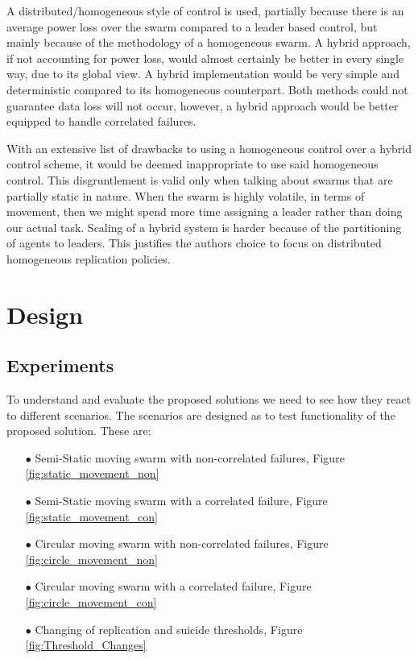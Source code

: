 \documentclass{UoYCSproject}
\begin{document}
A distributed/homogeneous style of control is used, partially because there is an average power loss over the swarm compared to a leader based control, but mainly because of the methodology of a homogeneous swarm. A hybrid approach, if not accounting for power loss, would almost certainly be better in every single way, due to its global view. A hybrid implementation would be very simple and deterministic compared to its homogeneous counterpart. Both methods could not guarantee data loss will not occur, however, a hybrid approach would be better equipped to handle correlated failures.

With an extensive list of drawbacks to using a homogeneous control over a hybrid control scheme, it would be deemed inappropriate to use said homogeneous control. This disgruntlement is valid only when talking about swarms that are partially static in nature. When the swarm is highly volatile, in terms of movement, then we might spend more time assigning a leader rather than doing our actual task. Scaling of a hybrid system is harder because of the partitioning of agents to leaders. This justifies the authors choice to focus on distributed homogeneous replication policies.


\chapter{Design}
\label{cha:Design}

\section{Experiments}
\label{sec:expriments}

To understand and evaluate the proposed solutions we need to see how they react to different scenarios.
The scenarios are designed as to test functionality of the proposed solution.
These are:

\begin{itemize}
\itemsep-1em
\item[$\bullet$] Semi-Static moving swarm with non-correlated failures, Figure \ref{fig:static_movement_non}
\item[$\bullet$] Semi-Static moving swarm with a correlated failure, Figure \ref{fig:static_movement_con}
\item[$\bullet$] Circular moving swarm with non-correlated failures, Figure \ref{fig:circle_movement_non}
\item[$\bullet$] Circular moving swarm with a correlated failure, Figure \ref{fig:circle_movement_con}
\item[$\bullet$] Changing of replication and suicide thresholds, Figure \ref{fig:Threshold_Changes}
\end{itemize}
\end{document}
